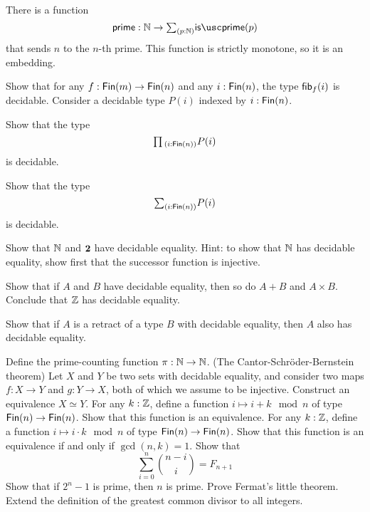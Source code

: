 \begin{cor}
  There is a function
  \begin{equation*}
    \primetype : \N \to \sm{p:\N}\isprime(p)
  \end{equation*}
  that sends $n$ to the $n$-th prime. This function is strictly monotone, so it is an embedding.
\end{cor}

\begin{exercises}
\exercise Show that for any $f:\mathsf{Fin}(m)\to\mathsf{Fin}(n)$ and any $i:\mathsf{Fin}(n)$, the type $\mathsf{fib}_{f}(i)$ is decidable.
\exercise Consider a decidable type $P(i)$ indexed by $i:\mathsf{Fin}(n)$.
  \begin{subexenum}
  \item Show that the type
    \begin{equation*}
      \prd{i:\Fin(n)}P(i)
    \end{equation*}
    is decidable.
  \item Show that the type
    \begin{equation*}
      \sm{i:\Fin(n)}P(i)
    \end{equation*}
    is decidable.
  \end{subexenum}
\exercise
  \begin{subexenum}
  \item Show that ${\mathbb{N}}$ and $\mathbf{2}$ have decidable equality. Hint: to show that ${\mathbb{N}}$ has decidable equality, show first that the successor function is injective.
  \item Show that if $A$ and $B$ have decidable equality, then so do $A+B$ and $A\times B$. Conclude that ${\mathbb{Z}}$ has decidable equality.
  \item Show that if $A$ is a retract of a type $B$ with decidable equality, then $A$ also has decidable equality.
  \end{subexenum}
\exercise Define the prime-counting function $\pi:{\mathbb{N}}\to{\mathbb{N}}$.
\exercise (The Cantor-Schr\"oder-Bernstein theorem) Let $X$ and $Y$ be two sets with decidable equality, and consider two maps $f:X\to Y$ and $g:Y\to X$, both of which we assume to be injective. Construct an equivalence $X\simeq Y$.
\exercise For any $k:{\mathbb{Z}}$, define a function $i\mapsto i+k \mod n$ of type $\mathsf{Fin}(n)\to\mathsf{Fin}(n)$. Show that this function is an equivalence.
\exercise For any $k:{\mathbb{Z}}$, define a function $i\mapsto i\cdot k \mod n$ of type $\mathsf{Fin}(n)\to\mathsf{Fin}(n)$. Show that this function is an equivalence if and only if $\gcd(n,k)=1$.
\exercise Show that
  \begin{equation*}
    \sum_{i=0}^n \binom{n-i}{i}=F_{n+1}
  \end{equation*}
\exercise Show that if $2^n-1$ is prime, then $n$ is prime.
\exercise Prove Fermat's little theorem.
\exercise Extend the definition of the greatest common divisor to all integers.
\end{exercises}
